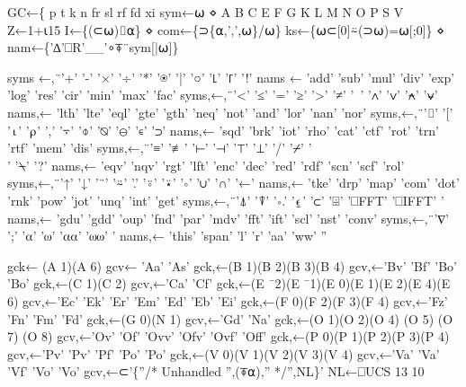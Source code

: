 \documentclass{article}%
\begin{document}
\nwenddocs{}\endmoddef\nwstartdeflinemarkup{}\nwenddeflinemarkup
GC←\{
        p t k n fr sl rf fd xi sym←⍵ ⋄ A B C E F G K L M N O P S V Z←1+⍳15
        I←\{(⊂⍵)⌷⍺\} ⋄ com←\{⊃\{⍺,',',⍵\}/⍵\}
        ks←\{⍵⊂[0]⍨(⊃⍵)=⍵[;0]\} ⋄ nam←\{'∆'⎕R'__'∘⍕¨sym[|⍵]\}

        syms ←,¨'+'           '-'            '×'            '÷'            '*'             '⍟'           '|'              '○'           '⌊'          '⌈'           '!'
        nams ←        'add'    'sub'  'mul' 'div' 'exp' 'log' 'res'    'cir'   'min'  'max' 'fac'
        syms,←,¨'<'           '≤'          '='             '≥'           '>'             '≠'           '~'              '∧'           '∨'          '⍲'           '⍱'
        nams,←        'lth'    'lte'  'eql' 'gte' 'gth' 'neq' 'not'    'and'   'lor'  'nan' 'nor'
        syms,←,¨'⌷'                 '['            '⍳'           '⍴'           ','             '⍪'           '⌽'            '⍉'           '⊖'          '∊'           '⊃'
        nams,←        'sqd'    'brk'  'iot' 'rho' 'cat' 'ctf' 'rot'    'trn'   'rtf'  'mem' 'dis'
        syms,←,¨'≡'                 '≢'          '⊢'           '⊣'           '⊤'           '⊥'           '/'              '⌿'           '\\'            '⍀'           '?'
        nams,←        'eqv'    'nqv'  'rgt' 'lft' 'enc' 'dec' 'red'    'rdf'   'scn'  'scf' 'rol'
        syms,←,¨'↑'                 '↓'          '¨'            '⍨'           '.'             '⍤'           '⍣'            '∘'           '∪'          '∩'           '←'
        nams,←        'tke'    'drp'  'map' 'com' 'dot' 'rnk' 'pow'    'jot'   'unq'  'int' 'get'
        syms,←,¨'⍋'                 '⍒'          '∘.'  '⍷'           '⊂'           '⌹'           '⎕FFT' '⎕IFFT' '%
        nams,←        'gdu'    'gdd'  'oup' 'fnd' 'par' 'mdv' 'fft'    'ift'   'scl'  'nst' 'conv'
        syms,←,¨'∇'                 ';'            '⍺'           '⍵'           '⍺⍺'        '⍵⍵'        '%
        nams,←        'this' 'span' 'l'               'r'             'aa'    'ww'    ''

        gck← (A 1)(A 6)
        gcv← 'Aa' 'As'
        gck,←(B 1)(B 2)(B 3)(B 4)
        gcv,←'Bv' 'Bf' 'Bo' 'Bo'
        gck,←(C 1)(C 2)
        gcv,←'Ca' 'Cf'
        gck,←(E ¯2)(E ¯1)(E 0)(E 1)(E 2)(E 4)(E 6)
        gcv,←'Ec'      'Ek'    'Er' 'Em' 'Ed' 'Eb' 'Ei'
        gck,←(F 0)(F 2)(F 3)(F 4)
        gcv,←'Fz' 'Fn' 'Fm' 'Fd'
        gck,←(G 0)(N 1)
        gcv,←'Gd' 'Na'
        gck,←(O 1)(O 2)(O 4) (O 5) (O 7) (O 8)
        gcv,←'Ov' 'Of' 'Ovv' 'Ofv' 'Ovf' 'Off'
        gck,←(P 0)(P 1)(P 2)(P 3)(P 4)
        gcv,←'Pv' 'Pv' 'Pf' 'Po' 'Po'
        gck,←(V 0)(V 1)(V 2)(V 3)(V 4)
        gcv,←'Va' 'Va' 'Vf' 'Vo' 'Vo'
        gcv,←⊂'\{''/* Unhandled '',(⍕⍺),'' */'',NL\}'
        NL←⎕UCS 13 10
\end{document}
